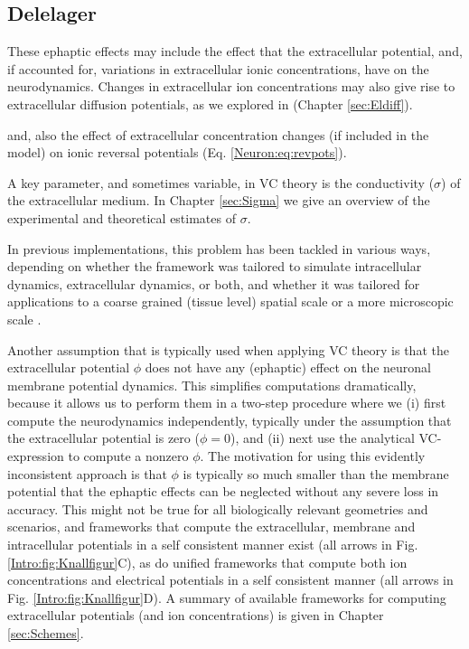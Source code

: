 


\subsection{Delelager}
These ephaptic effects may include the effect that the extracellular potential, and, if accounted for, variations in extracellular ionic concentrations, have on the neurodynamics. Changes in extracellular ion concentrations may also give rise to extracellular diffusion potentials, as we explored in (Chapter \ref{sec:Eldiff}).


and, also the effect of extracellular concentration changes  (if included in the model) on ionic reversal potentials (Eq. \ref{Neuron:eq:revpots}). 


A key parameter, and sometimes variable, in VC theory is the conductivity ($\sigma$) of the extracellular medium. In Chapter \ref{sec:Sigma} we give an overview of the experimental and theoretical estimates of $\sigma$. 


In previous implementations, this problem has been tackled in various ways, depending on whether the framework was tailored to simulate intracellular dynamics, extracellular dynamics, or both, and whether it was tailored for applications to a coarse grained (tissue level) spatial scale or a more microscopic scale \citep{Qian1989, Mori2008, Mori2009, Mori2009a, Mori2011, Halnes2015, Halnes2013, Pods2017, Niederer2013, OConnell2016, Solbra2018, tuttle2019, ellingsrud2020}.



Another assumption that is typically used when applying VC theory is that the extracellular potential $\phi$ does not have any (ephaptic) effect on the neuronal membrane potential dynamics. This simplifies computations dramatically, because it allows us to perform them in a two-step procedure where we (i) first compute the neurodynamics independently, typically under the assumption that the extracellular potential is zero ($\phi = 0$), and (ii) next use the analytical VC-expression to compute a nonzero $\phi$. The motivation for using this evidently inconsistent approach is that $\phi$ is typically so much smaller than the membrane potential that the ephaptic effects can be neglected without any severe loss in accuracy. This might not be true for all biologically relevant geometries and scenarios, and frameworks that compute the extracellular, membrane and intracellular potentials in a self consistent manner exist (all arrows in Fig. \ref{Intro:fig:Knallfigur}C), as do unified frameworks that compute both ion concentrations and electrical potentials in a self consistent manner (all arrows in Fig. \ref{Intro:fig:Knallfigur}D). A summary of available frameworks for computing extracellular potentials (and ion concentrations) is given in Chapter \ref{sec:Schemes}.



